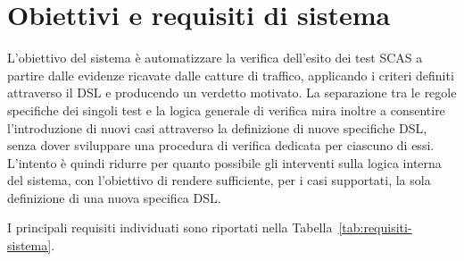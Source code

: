 \section{Obiettivi e requisiti di sistema}\label{obiettivi-e-requisiti-di-sistema}

L'obiettivo del sistema è automatizzare la verifica dell'esito dei test SCAS a partire dalle evidenze ricavate dalle catture di traffico, applicando i criteri definiti attraverso il DSL e producendo un verdetto motivato. La separazione tra le regole specifiche dei singoli test e la logica generale di verifica mira inoltre a consentire l'introduzione di nuovi casi attraverso la definizione di nuove specifiche DSL, senza dover sviluppare una procedura di verifica dedicata per ciascuno di essi. L'intento è quindi ridurre per quanto possibile gli interventi sulla logica interna del sistema, con l'obiettivo di rendere sufficiente, per i casi supportati, la sola definizione di una nuova specifica DSL.

I principali requisiti individuati sono riportati nella Tabella~\ref{tab:requisiti-sistema}.

